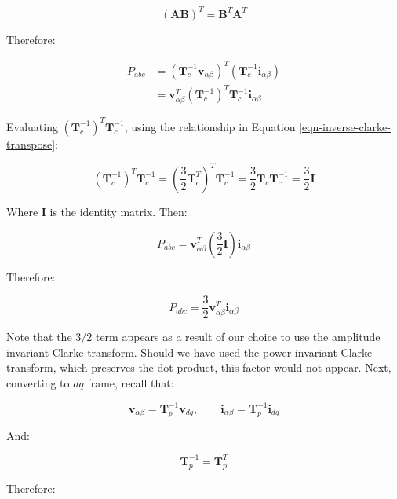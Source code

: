 \documentclass{article}
\begin{document}
\begin{equation}
    (\mathbf{AB})^T = \mathbf{B}^T\mathbf{A}^T
\end{equation}

Therefore:

\begin{align}
    P_{abc} 
    &= (\mathbf{T}_c^{-1}\mathbf{v}_{\alpha\beta})^T (\mathbf{T}_c^{-1}\mathbf{i}_{\alpha\beta}) \\[6pt]
    &= \mathbf{v}_{\alpha\beta}^T(\mathbf{T}_c^{-1})^T\mathbf{T}_c^{-1}\mathbf{i}_{\alpha\beta}
\end{align}

Evaluating $(\mathbf{T}_c^{-1})^T\mathbf{T}_c^{-1}$, using the relationship in Equation \ref{eqn-inverse-clarke-transpose}:

\begin{equation}
    (\mathbf{T}_c^{-1})^T\mathbf{T}_c^{-1} = (\frac{3}{2}\mathbf{T}_c^T)^T\mathbf{T}_c^{-1} = \frac{3}{2}\mathbf{T}_c\mathbf{T}_c^{-1} = \frac{3}{2}\mathbf{I}
\end{equation}

Where $\mathbf{I}$ is the identity matrix. Then:

\begin{equation}
    P_{abc} = \mathbf{v}_{\alpha\beta}^T(\frac{3}{2}\mathbf{I})\mathbf{i}_{\alpha\beta}
\end{equation}

Therefore:

\begin{equation}
    P_{abc} = \frac{3}{2}\mathbf{v}_{\alpha\beta}^T\mathbf{i}_{\alpha\beta}
\end{equation}

Note that the $3/2$ term appears as a result of our choice to use the amplitude invariant Clarke transform. Should we have used the power invariant Clarke transform, which preserves the dot product, this factor would not appear. Next, converting to $dq$ frame, recall that:

\begin{equation}
    \mathbf{v}_{\alpha\beta} = \mathbf{T}_p^{-1}\mathbf{v}_{dq}, \qquad
    \mathbf{i}_{\alpha\beta} = \mathbf{T}_p^{-1}\mathbf{i}_{dq}
\end{equation}

And:

\begin{equation}
    \mathbf{T}_p^{-1} = \mathbf{T}_p^T
\end{equation}

Therefore:
\end{document}
